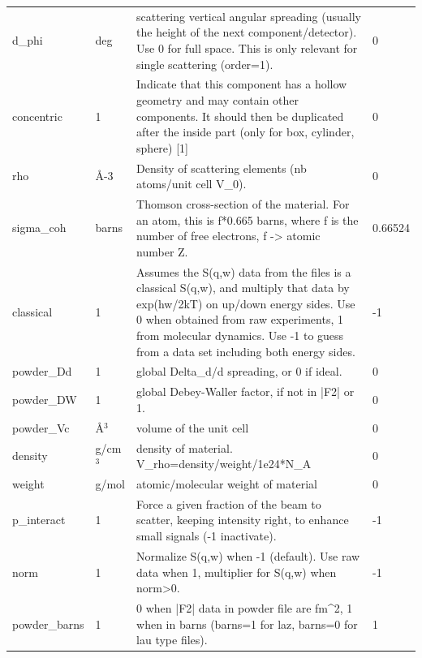 \begin{longtable}{p{}p{}p{}p{}}
d\_phi & deg & scattering vertical angular spreading (usually the height of the next component/detector). Use 0 for full space. This is only relevant for single scattering (order=1). & 0 \\
concentric & 1 & Indicate that this component has a hollow geometry and may contain other components. It should then be duplicated after the inside part (only for box, cylinder, sphere) [1] & 0 \\
rho & \AA{}-3 & Density of scattering elements (nb atoms/unit cell V\_0). & 0 \\
sigma\_coh & barns & Thomson cross-section of the material. For an atom, this is f*0.665 barns, where f is the number of free electrons, f -\textgreater{} atomic number Z. & 0.66524 \\
classical & 1 & Assumes the S(q,w) data from the files is a classical S(q,w), and multiply that data by exp(hw/2kT) on up/down energy sides. Use 0 when obtained from raw experiments, 1 from molecular dynamics. Use -1 to guess from a data set including both energy sides. & -1 \\
powder\_Dd & 1 & global Delta\_d/d spreading, or 0 if ideal. & 0 \\
powder\_DW & 1 & global Debey-Waller factor, if not in |F2| or 1. & 0 \\
powder\_Vc & \AA{}$^{3}$ & volume of the unit cell & 0 \\
density & g/cm$^{3}$ & density of material. V\_rho=density/weight/1e24*N\_A & 0 \\
weight & g/mol & atomic/molecular weight of material & 0 \\
p\_interact & 1 & Force a given fraction of the beam to scatter, keeping intensity right, to enhance small signals (-1 inactivate). & -1 \\
norm & 1 & Normalize S(q,w) when -1 (default). Use raw data when 1, multiplier for S(q,w) when norm\textgreater{}0. & -1 \\
powder\_barns & 1 & 0 when |F2| data in powder file are fm\textasciicircum{}2, 1 when in barns (barns=1 for laz, barns=0 for lau type files). & 1 \\
\bottomrule
\end{longtable}

